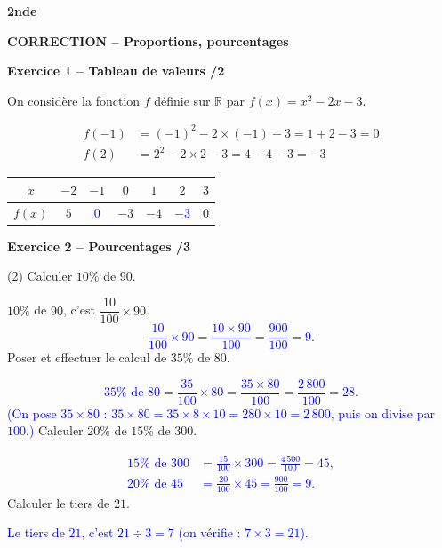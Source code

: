 \documentclass[10pt,a4paper]{article}
\renewcommand{\niveau}{2nde}
\renewcommand{\chapitre}{Proportions, pourcentages}
\renewcommand{\interroversion}[1]{
    \noindent\textbf{\niveau}

    \vspace{-0.5cm}
    \begin{center}
        \textbf{\large CORRECTION -- \chapitre}
    \end{center}

    \vspace{0.1cm}
}
\begin{document}

\interroversion{A}

\textbf{Exercice 1 -- Tableau de valeurs \hfill /2}

On considère la fonction \(f\) définie sur \(\mathbb{R}\) par \(f(x)=x^2-2x-3\).

\[
\begin{aligned}
f(-1) &= (-1)^2-2\times(-1)-3 = 1+2-3 = 0\\
f(2)  &= 2^2-2\times 2-3 = 4-4-3 = -3
\end{aligned}
\]

\begin{center}
    \renewcommand{\arraystretch}{1.5}
    \setlength{\tabcolsep}{0.25cm}
    \begin{tabular}{|*{7}{c|}}
    \hline
    \(x\) & \(-2\) & \(-1\) & \(0\) & \(1\) & \(2\) & \(3\) \\
    \hline
    \(f(x)\) & \(5\) & \textcolor{blue}{\(0\)} & \(-3\) & \(-4\) & \textcolor{blue}{\(-3\)} & \(0\) \\
    \hline
    \end{tabular}
\end{center}

\textbf{Exercice 2 -- Pourcentages \hfill /3}

\begin{tasks}(2)
    \task Calculer \(10\%\) de \(90\).

    \(10\%\) de \(90\), c'est \(\dfrac{10}{100}\times 90\). \textcolor{blue}{
    \[
    \frac{10}{100}\times 90 = \frac{10\times 90}{100} = \frac{900}{100} = 9.
    \]}
    \task Poser et effectuer le calcul de \(35\%\) de \(80\).

    \textcolor{blue}{
    \[
    35\%\text{ de }80 = \frac{35}{100}\times 80 = \frac{35\times 80}{100} = \frac{2\,800}{100} = 28.
    \]
    (On pose \(35\times80\) : \(35\times80=35\times8\times10=280\times10=2\,800\), puis on divise par \(100\).)}
    \task Calculer \(20\%\) de \(15\%\) de \(300\).

    \textcolor{blue}{
    \[
    \begin{aligned}
    15\%\text{ de }300 &=\frac{15}{100}\times300=\frac{4\,500}{100}=45,\\
    20\%\text{ de }45 &=\frac{20}{100}\times45=\frac{900}{100}=9.
    \end{aligned}
    \]}
    \task Calculer le tiers de \(21\).

    \textcolor{blue}{Le tiers de \(21\), c'est \(21\div3=7\) (on vérifie : \(7\times3=21\)).}
\end{tasks}
\end{document}

